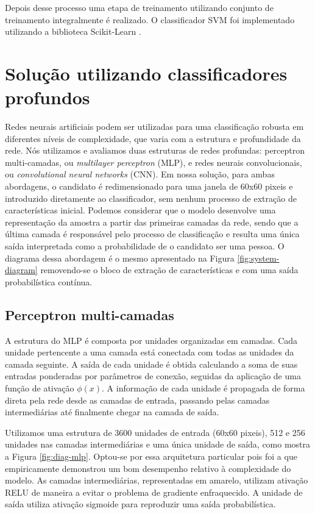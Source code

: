  Depois desse processo uma etapa de treinamento utilizando conjunto de treinamento integralmente é realizado. O classificador SVM foi implementado utilizando a biblioteca Scikit-Learn \cite{scikit-learn}.


\section{Solução utilizando classificadores profundos}
\label{sec:deep}

    Redes neurais artificiais podem ser utilizadas para uma classificação robusta em diferentes níveis de complexidade, que varia com a estrutura e profundidade da rede. Nós utilizamos e avaliamos duas estruturas de redes profundas: perceptron multi-camadas, ou \textit{multilayer perceptron} (MLP), e redes neurais convolucionais, ou \textit{convolutional neural networks} (CNN). Em nossa solução, para ambas abordagens, o candidato é redimensionado para uma janela de 60x60 pixeis e introduzido diretamente ao classificador, sem nenhum processo de extração de características inicial. Podemos considerar que o modelo desenvolve uma representação da amostra a partir das primeiras camadas da rede, sendo que a última camada é responsável pelo processo de classificação e resulta uma única saída interpretada como a probabilidade de o candidato ser uma pessoa. O diagrama dessa abordagem é o mesmo apresentado na Figura \ref{fig:system-diagram} removendo-se o bloco de extração de características e com uma saída probabilística contínua.

    \subsection{Perceptron multi-camadas}
        A estrutura do MLP é composta por unidades organizadas em camadas. Cada unidade pertencente a uma camada está conectada com todas as unidades da camada seguinte. A saída de cada unidade é obtida calculando a soma de suas entradas ponderadas por parâmetros de conexão, seguidas da aplicação de uma função de ativação $\phi(x)$. A informação de cada unidade é propagada de forma direta pela rede desde as camadas de entrada, passando pelas camadas intermediárias até finalmente chegar na camada de saída.

        Utilizamos uma estrutura de 3600 unidades de entrada (60x60 pixeis), 512 e 256 unidades nas camadas intermediárias e uma única unidade de saída, como mostra a Figura \ref{fig:diag-mlp}. Optou-se por essa arquitetura particular pois foi a que empiricamente demonstrou um bom desempenho relativo à complexidade do modelo. As camadas intermediárias, representadas em amarelo, utilizam ativação RELU \cite{nair2010relu} de maneira a evitar o problema de gradiente enfraquecido. A unidade de saída utiliza ativação sigmoide para reproduzir uma saída probabilística. 

